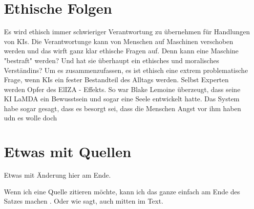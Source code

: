 \documentclass{report}
\begin{document}
\section{Ethische Folgen}
Es wird ethisch immer schwieriger Verantwortung zu übernehmen für Handlungen von KIs. Die Verantwortunge kann von Menschen auf Maschinen verschoben werden und das wirft ganz klar ethische Fragen auf. Denn kann eine Maschine "bestraft" werden? Und hat sie überhaupt ein ethisches und moralisches Verständins? Um es zusammenzufassen, es ist ethisch eine extrem problematische Frage, wenn KIs ein fester Bestandteil des Alltags werden.
Selbst Experten werden Opfer des ElIZA - Effekts. So war Blake Lemoine überzeugt, dass seine KI LaMDA ein Bewusstsein und sogar eine Seele entwickelt hatte. Das System habe sogar gesagt, dass es besorgt sei, dass die Menschen Angst vor ihm haben udn es wolle doch



\section{Etwas mit Quellen}

Etwas mit Änderung hier am Ende.

Wenn ich eine Quelle zitieren möchte, kann ich das ganze einfach am Ende des Satzes machen \citep{example}. Oder wie \citet{example} sagt, auch mitten im Text.

\printbibliography
\end{document}
